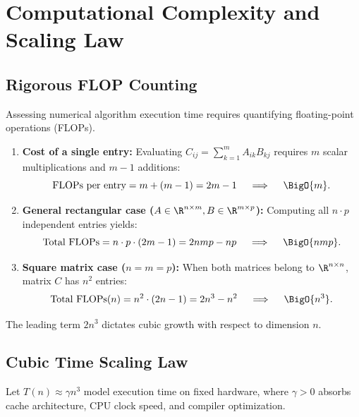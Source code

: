 \FloatBarrier
\section{Computational Complexity and Scaling Law}

\subsection{Rigorous FLOP Counting}

Assessing numerical algorithm execution time requires quantifying floating-point operations (FLOPs).

\begin{property}
\mbox{}\par\nopagebreak
\begin{enumerate}
    \item \textbf{Cost of a single entry:}
    Evaluating $C_{ij} = \sum_{k=1}^m A_{ik} B_{kj}$ requires $m$ scalar multiplications and $m - 1$ additions:
    \begin{equation}
        \text{FLOPs per entry} = m + (m - 1) = 2m - 1 \quad \implies \quad \BigO{m}.
    \end{equation}
    \item \textbf{General rectangular case ($A \in \R^{n \times m}, B \in \R^{m \times p}$):}
    Computing all $n \cdot p$ independent entries yields:
    \begin{equation}
        \text{Total FLOPs} = n \cdot p \cdot (2m - 1) = 2nmp - np \quad \implies \quad \BigO{nmp}.
    \end{equation}
    \item \textbf{Square matrix case ($n = m = p$):}
    When both matrices belong to $\R^{n \times n}$, matrix $C$ has $n^2$ entries:
    \begin{equation}
        \text{Total FLOPs}(n) = n^2 \cdot (2n - 1) = 2n^3 - n^2 \quad \implies \quad \BigO{n^3}.
    \end{equation}
\end{enumerate}
\end{property}

The leading term $2n^3$ dictates cubic growth with respect to dimension $n$.

\subsection{Cubic Time Scaling Law}

Let $T(n) \approx \gamma n^3$ model execution time on fixed hardware, where $\gamma > 0$ absorbs cache architecture, CPU clock speed, and compiler optimization.

